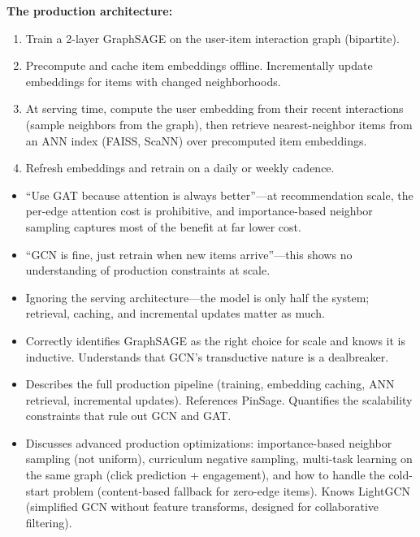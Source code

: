 \begin{interviewq}
\textbf{The production architecture:}
\begin{enumerate}
    \item Train a 2-layer GraphSAGE on the user-item interaction graph (bipartite).
    \item Precompute and cache item embeddings offline. Incrementally update embeddings for items with changed neighborhoods.
    \item At serving time, compute the user embedding from their recent interactions (sample neighbors from the graph), then retrieve nearest-neighbor items from an ANN index (FAISS, ScaNN) over precomputed item embeddings.
    \item Refresh embeddings and retrain on a daily or weekly cadence.
\end{enumerate}

\redflags
\begin{itemize}
    \item ``Use GAT because attention is always better''---at recommendation scale, the per-edge attention cost is prohibitive, and importance-based neighbor sampling captures most of the benefit at far lower cost.
    \item ``GCN is fine, just retrain when new items arrive''---this shows no understanding of production constraints at scale.
    \item Ignoring the serving architecture---the model is only half the system; retrieval, caching, and incremental updates matter as much.
\end{itemize}


\goodgreat
\begin{itemize}
    \item {} Correctly identifies GraphSAGE as the right choice for scale and knows it is inductive. Understands that GCN's transductive nature is a dealbreaker.
    \item {} Describes the full production pipeline (training, embedding caching, ANN retrieval, incremental updates). References PinSage. Quantifies the scalability constraints that rule out GCN and GAT.
    \item {} Discusses advanced production optimizations: importance-based neighbor sampling (not uniform), curriculum negative sampling, multi-task learning on the same graph (click prediction + engagement), and how to handle the cold-start problem (content-based fallback for zero-edge items). Knows LightGCN (simplified GCN without feature transforms, designed for collaborative filtering).
\end{itemize}

\end{interviewq}

